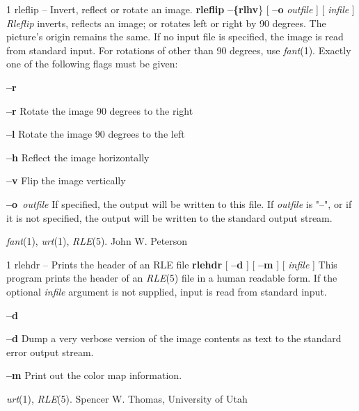 %
%
%
 1
rleflip -- Invert, reflect or rotate an image.
{\bf rleflip}
{\bf --\{rlhv}\}
[ 
{\bf --o}
{\it outfile}
] [
{\it infile}
]
{\it Rleflip}
inverts, reflects an image; or rotates left or right by 90 degrees.  The
picture's origin remains the same.  If no input file is specified, the
image is read from standard input.  For rotations of other than 90
degrees, use
{\it fant}{\rm (1).}
Exactly one of the following flags must be given:
\begin{TPlist}{{\bf --r}}
\item[{{\bf --r}}]
Rotate the image 90 degrees to the right
\item[{{\bf --l}}]
Rotate the image 90 degrees to the left
\item[{{\bf --h}}]
Reflect the image horizontally
\item[{{\bf --v}}]
Flip the image vertically
\item[{{\bf --o}{\it \ outfile}
}]
If specified, the output will be written to this file.  If 
{\it outfile}
is "--", or if it is not specified, the output will be written to the
standard output stream.
\end{TPlist}
{\it fant}{\rm (1),}
{\it urt}{\rm (1),}
{\it RLE}{\rm (5).}
John W. Peterson

\newpage


%
%
%
 1
rlehdr -- Prints the header of an RLE file
{\bf rlehdr}
[
{\bf --d}
] [
{\bf --m}
] [
{\it infile}
]
This program prints the header of an
{\it RLE}{\rm (5)}
file in a human readable form.  If the optional
{\it infile}
argument is not supplied, input is read from standard input.
\begin{TPlist}{{\bf --d}}
\item[{{\bf --d}}]
Dump a very verbose version of the image contents as text to the
standard error output stream.
\item[{{\bf --m}}]
Print out the color map information.
\end{TPlist}
{\it urt}{\rm (1),}
{\it RLE}{\rm (5).}
Spencer W. Thomas, University of Utah
\newpage


